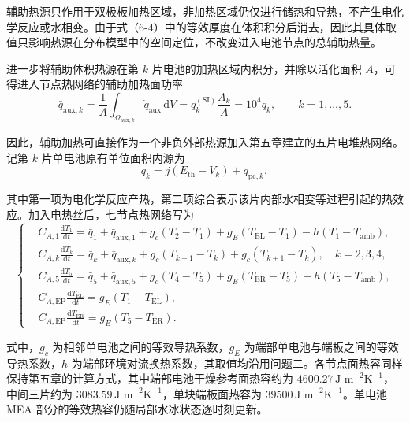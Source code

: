 \documentclass[bwprint]{gmcmthesis}
\numberwithin{figure}{section}
\begin{document}
\noindent 辅助热源只作用于双极板加热区域，非加热区域仍仅进行储热和导热，不产生电化学反应或水相变。由于式（6-4）中的等效厚度在体积积分后消去，因此其具体取值只影响热源在分布模型中的空间定位，不改变进入电池节点的总辅助热量。

\noindent 进一步将辅助体积热源在第 \(k\) 片电池的加热区域内积分，并除以活化面积 \(A\)，可得进入节点热网络的辅助加热面功率
\begin{equation}
\bar{q}_{\text{aux},k} = \frac{1}{A} \int_{\Omega_{\text{aux},k}} \dot{q}_{\text{aux}} \, \mathrm{d}V = q_k^{(\text{SI})} \frac{A_k}{A} = 10^4 q_k, \qquad k = 1, \dots, 5. \tag{6-6}
\end{equation}

\noindent 因此，辅助加热可直接作为一个非负外部热源加入第五章建立的五片电堆热网络。记第 \(k\) 片单电池原有单位面积内源为
\begin{equation}
\bar{q}_k = j (E_{\text{th}} - V_k) + \bar{q}_{\text{pc},k}, \tag{6-7}
\end{equation}

\noindent 其中第一项为电化学反应产热，第二项综合表示该片内部水相变等过程引起的热效应。加入电热丝后，七节点热网络写为
\begin{equation}
\left\{
\begin{aligned}
& C_{A,1} \frac{\text{d}T_1}{\text{d}t} = \bar{q}_1 + \bar{q}_{\text{aux},1} + g_c(T_2 - T_1) + g_E(T_{\text{EL}} - T_1) - h(T_1 - T_{\text{amb}}), \\
& C_{A,k} \frac{\text{d}T_k}{\text{d}t} = \bar{q}_k + \bar{q}_{\text{aux},k} + g_c(T_{k-1} - T_k) + g_c(T_{k+1} - T_k), \quad k = 2, 3, 4, \\
& C_{A,5} \frac{\text{d}T_5}{\text{d}t} = \bar{q}_5 + \bar{q}_{\text{aux},5} + g_c(T_4 - T_5) + g_E(T_{\text{ER}} - T_5) - h(T_5 - T_{\text{amb}}), \\
& C_{A,\text{EP}} \frac{\text{d}T_{\text{EL}}}{\text{d}t} = g_E(T_1 - T_{\text{EL}}), \\
& C_{A,\text{EP}} \frac{\text{d}T_{\text{ER}}}{\text{d}t} = g_E(T_5 - T_{\text{ER}}).
\end{aligned}
\right.
\tag{6-8}
\end{equation}

\noindent 式中，\(g_c\) 为相邻单电池之间的等效导热系数，\(g_E\) 为端部单电池与端板之间的等效导热系数，\(h\) 为端部环境对流换热系数，其取值均沿用问题二。各节点面热容同样保持第五章的计算方式，其中端部电池干燥参考面热容约为 \(4600.27 \, \text{J m}^{-2}\text{K}^{-1}\)，中间三片约为 \(3083.59 \, \text{J m}^{-2}\text{K}^{-1}\)，单块端板面热容为 \(39500 \, \text{J m}^{-2}\text{K}^{-1}\)。单电池 MEA 部分的等效热容仍随局部水冰状态逐时刻更新。
\end{document}
